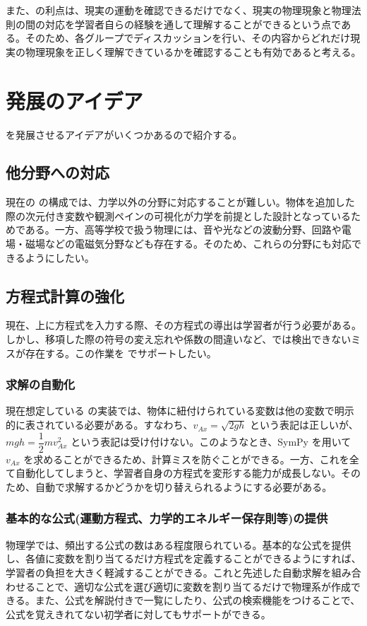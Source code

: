 また、\simname の利点は、現実の運動を確認できるだけでなく、現実の物理現象と物理法則の間の対応を学習者自らの経験を通して理解することができるという点である。そのため、各グループでディスカッションを行い、その内容からどれだけ現実の物理現象を正しく理解できているかを確認することも有効であると考える。

\clearpage
\section{発展のアイデア}

\simname を発展させるアイデアがいくつかあるので紹介する。

\subsection{他分野への対応}

現在の \simname の構成では、力学以外の分野に対応することが難しい。物体を追加した際の次元付き変数や観測ペインの可視化が力学を前提とした設計となっているためである。一方、高等学校で扱う物理には、音や光などの波動分野、回路や電場・磁場などの電磁気分野なども存在する。そのため、これらの分野にも対応できるようにしたい。

\subsection{方程式計算の強化}

現在、\simname 上に方程式を入力する際、その方程式の導出は学習者が行う必要がある。しかし、移項した際の符号の変え忘れや係数の間違いなど、\simname では検出できないミスが存在する。この作業を \simname でサポートしたい。

\subsubsection*{求解の自動化}
現在想定している \simname の実装では、物体に紐付けられている変数は他の変数で明示的に表されている必要がある。すなわち、$v_{Ax} = \sqrt{2gh}$ という表記は正しいが、$mgh = \dfrac{1}{2}mv_{Ax}^2$ という表記は受け付けない。このようなとき、SymPy を用いて $v_{Ax}$ を求めることができるため、計算ミスを防ぐことができる。一方、これを全て自動化してしまうと、学習者自身の方程式を変形する能力が成長しない。そのため、自動で求解するかどうかを切り替えられるようにする必要がある。

\subsubsection*{基本的な公式(運動方程式、力学的エネルギー保存則等)の提供}
物理学では、頻出する公式の数はある程度限られている。基本的な公式を提供し、各値に変数を割り当てるだけ方程式を定義することができるようにすれば、学習者の負担を大きく軽減することができる。これと先述した自動求解を組み合わせることで、適切な公式を選び適切に変数を割り当てるだけで物理系が作成できる。また、公式を解説付きで一覧にしたり、公式の検索機能をつけることで、公式を覚えきれてない初学者に対してもサポートができる。
